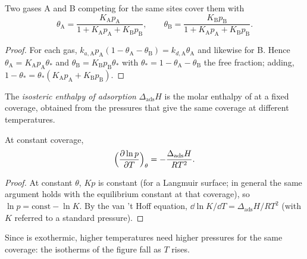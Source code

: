 \begin{proposition}\label{prop:b3:surfaces-catalysis:competitive}
Two gases A and B competing for the same sites cover them with
\[
  \theta_{\mathrm A} = \frac{K_{\mathrm A}p_{\mathrm A}}{1 + K_{\mathrm A}p_{\mathrm A} + K_{\mathrm B}p_{\mathrm B}}, \qquad
  \theta_{\mathrm B} = \frac{K_{\mathrm B}p_{\mathrm B}}{1 + K_{\mathrm A}p_{\mathrm A} + K_{\mathrm B}p_{\mathrm B}} .
\]
\end{proposition}

\begin{proof}
For each gas, $k_{a,\mathrm A}p_{\mathrm A}(1 - \theta_{\mathrm A} - \theta_{\mathrm B}) = k_{d,\mathrm A}\theta_{\mathrm A}$ and likewise for B. Hence
$\theta_{\mathrm A} = K_{\mathrm A}p_{\mathrm A}\theta_\ast$ and $\theta_{\mathrm B} = K_{\mathrm B}p_{\mathrm B}\theta_\ast$ with $\theta_\ast = 1 - \theta_{\mathrm A} - \theta_{\mathrm B}$ the free fraction; adding,
$1 - \theta_\ast = \theta_\ast(K_{\mathrm A}p_{\mathrm A} + K_{\mathrm B}p_{\mathrm B})$.
\end{proof}

\begin{definition}\label{def:b3:surfaces-catalysis:isosteric}
The \emph{isosteric enthalpy of adsorption} $\Delta_{\mathrm{ads}}H$ is the molar enthalpy of  at a fixed coverage,
obtained from the pressures that give the same coverage at different
temperatures.
\end{definition}

\begin{proposition}\label{prop:b3:surfaces-catalysis:isosteric}
At constant coverage,
\[
  \Bigl(\frac{\partial\ln p}{\partial T}\Bigr)_\theta = -\frac{\Delta_{\mathrm{ads}}H}{RT^2} .
\]
\end{proposition}

\begin{proof}
At constant $\theta$, $Kp$ is constant (for a Langmuir surface; in general the same
argument holds with the equilibrium constant at that coverage), so $\ln p =
\text{const} - \ln K$. By the van 't Hoff equation, $\dd\ln K/\dd T = \Delta_{\mathrm{ads}}H/RT^2$ (with $K$
referred to a standard pressure).
\end{proof}

Since  is exothermic, higher temperatures need higher pressures for
the same coverage: the isotherms of the figure fall as $T$ rises.


